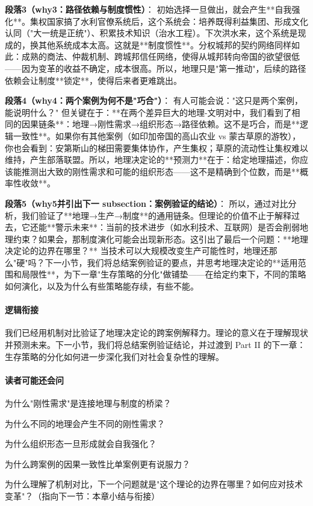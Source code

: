 \documentclass[openany, a4paper, 12pt]{book}
\begin{document}
	\textbf{段落3（why3：路径依赖与制度惯性）}：  
	初始选择一旦做出，就会产生**自我强化**。集权国家搞了水利官僚系统后，这个系统会：培养既得利益集团、形成文化认同（"大一统是正统"）、积累技术知识（治水工程）。下次洪水来，这个系统是现成的，换其他系统成本太高。这就是**制度惯性**。分权城邦的契约网络同样如此：成熟的商法、仲裁机制、跨城邦信任网络，使得从城邦转向帝国的欲望很低——因为变革的收益不确定，成本很高。所以，地理只是"第一推动"，后续的路径依赖会让制度**锁定**，使得后来者更难跳出。
	
	\textbf{段落4（why4：两个案例为何不是"巧合"）}：  
	有人可能会说："这只是两个案例，能说明什么？" 但关键在于：**在两个差异巨大的地理-文明对中，我们看到了相同的因果链条**：地理→刚性需求→组织形态→路径依赖。这不是巧合，而是**逻辑一致性**。如果你有其他案例（如印加帝国的高山农业 vs 蒙古草原的游牧），你也会看到：安第斯山的梯田需要集体协作，产生集权；草原的流动性让集权难以维持，产生部落联盟。所以，地理决定论的**预测力**在于：给定地理描述，你应该能推测出大致的刚性需求和可能的组织形态——这不是精确到个位数，而是**概率性收敛**。
	
	\textbf{段落5（why5并引出下一 subsection：案例验证的结论）}：  
	所以，通过对比分析，我们验证了**地理→生产→制度**的通用链条。但理论的价值不止于解释过去，它还能**警示未来**：当前的技术进步（如水利技术、互联网）是否会削弱地理约束？如果会，那制度演化可能会出现新形态。这引出了最后一个问题：**地理决定论的边界在哪里？** 当技术可以大规模改变生产可能性时，地理还那么"硬"吗？下一小节，我们将总结案例验证的要点，并思考地理决定论的**适用范围和局限性**，为下一章"生存策略的分化"做铺垫——在给定约束下，不同的策略如何演化，以及为什么有些策略能存续，有些不能。
	
	\paragraph*{逻辑衔接}
	我们已经用机制对比验证了地理决定论的跨案例解释力。理论的意义在于理解现状并预测未来。下一小节，我们将总结案例验证结论，并过渡到 Part II 的下一章：生存策略的分化如何进一步深化我们对社会复杂性的理解。
	
	\paragraph*{读者可能还会问}
	\item 为什么"刚性需求"是连接地理与制度的桥梁？
	\item 为什么不同的地理会产生不同的刚性需求？
	\item 为什么组织形态一旦形成就会自我强化？
	\item 为什么跨案例的因果一致性比单案例更有说服力？
	\item 为什么理解了机制对比，下一个问题就是"这个理论的边界在哪里？如何应对技术变革"？（指向下一节：本章小结与衔接）
	
\end{document}
